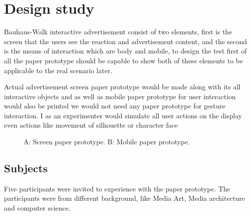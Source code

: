 \section{Design study}
Bauhaus-Walk interactive advertisement consist of two elements, first is the screen that the users see the reaction and advertisement content, and the second is the means of interaction which are body and mobile, to design the test first of all the paper prototype should be capable to show both of these elements to be applicable to the real scenario later.  

Actual advertisement screen paper prototype would be made along with its all interactive objects and as well as mobile paper prototype for user interaction would also be printed we would not need any paper prototype for gesture interaction. I as an experimenter would simulate all user actions on the display even actions like movement of silhouette or character face


\begin{figure}[H]
    \centering
    \hfill
    \caption{A: Screen paper prototype. B: Mobile paper prototype. }%
    \label{fig:paper_prototype}%
\end{figure}



\subsection{Subjects}
Five participants were invited to experience with the paper prototype.
The participants were from different background, like Media Art, Media architecture and computer science.

